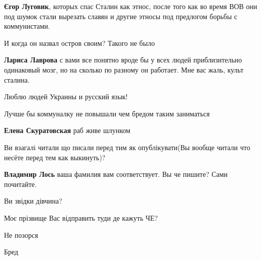 \begin{itemize}
\begin{itemize}
\textbf{Єгор Луговик}, которых спас Сталин как этнос, после того как во время ВОВ они под шумок стали вырезать славян и другие этносы под предлогом борьбы с коммунистами.

И когда он назвал остров своим? Такого не было

\textbf{Лариса Лаврова} с вами все понятно \Laughey[1.0][white]\Laughey[1.0][white]\Laughey[1.0][white]\Laughey[1.0][white]\Laughey[1.0][white] вроде бы у всех людей приблизительно одинаковый мозг, но на сколько по разному он работает. Мне вас жаль, культ сталина.

\end{itemize}

Люблю людей Украины и русский язык!

Лучше бы коммуналку не повышали чем бредом таким заниматься

\textbf{Елена Скуратовская} раб живе шлунком


Ви взагалі читали що писали перед тим як опублікувати(Вы вообще читали что
несёте перед тем как выкинуть)?

\begin{itemize}
\textbf{Владимир Лось} ваша фамилия вам соответствует. Вы че пишите? Сами почитайте.

Ви звідки дівчина?

Моє прізвище Вас відправить туди де кажуть ЧЕ?

Не позорся
\end{itemize}

Бред

\end{itemize}


